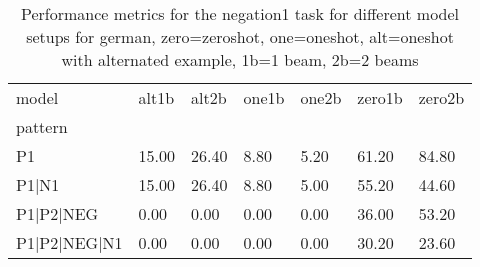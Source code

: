 \begin{table}[h]
\begin{tabular}{l|llllll}
\toprule
model & alt1b & alt2b & one1b & one2b & zero1b & zero2b \\
pattern &  &  &  &  &  &  \\
\midrule
P1 & 15.00 & 26.40 & 8.80 & 5.20 & 61.20 & 84.80 \\
P1|N1 & 15.00 & 26.40 & 8.80 & 5.00 & 55.20 & 44.60 \\
P1|P2|NEG & 0.00 & 0.00 & 0.00 & 0.00 & 36.00 & 53.20 \\
P1|P2|NEG|N1 & 0.00 & 0.00 & 0.00 & 0.00 & 30.20 & 23.60 \\
\bottomrule
\end{tabular}
\caption{Performance metrics for the negation1 task for different model setups for german, zero=zeroshot, one=oneshot, alt=oneshot with alternated example, 1b=1 beam, 2b=2 beams}
\label{tab:de_negation1_performance}
\end{table}

